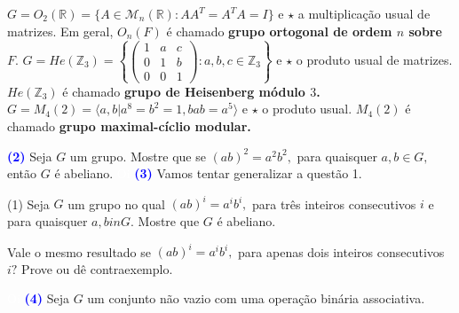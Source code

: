 \documentclass[12pt, a4paper]{article}
\newcommand{\negrito}[1]{\mbox{\boldmath{$#1$}}}
\begin{document}
\begin{tasks}[counter-format={(tsk[a])},label-width=3.6ex, label-format = {\bfseries}, column-sep = {0pt}]
\task[\textcolor{Floresta}{$\negrito{(i)} $}] $G = O_2(\mathbb{R}) = \{ A \in \mathcal{M}_n(\mathbb{R}) : AA^T = A^TA = I \}$ e $\star$ a multiplicação usual de matrizes. Em geral, $O_n(F)$ é chamado \textbf{grupo ortogonal de ordem $n$ sobre $F.$}
\task[\textcolor{Floresta}{$\negrito{(j)} $}] $G = He(\mathbb{Z}_3) = \left\{ \left( \begin{array}{ccc} 1 & a & c \\ 0 & 1 & b \\ 0 & 0 & 1 \end{array} \right) : a,b,c \in \mathbb{Z}_3 \right\}$ e $\star$ o produto usual de matrizes. $ He(\mathbb{Z}_3)$ é chamado \textbf{grupo de Heisenberg módulo $3$.}
\task[\textcolor{Floresta}{$\negrito{(k)} $}] $G = M_4(2) = \langle a,b | a^8 = b^2 = 1, bab = a^5 \rangle$ e $\star$ o produto usual. $ M_4(2)$ é chamado \textbf{grupo maximal-cíclio modular.}%

\end{tasks}
\textcolor{blue}{\bf(2)}\label{2} Seja $G$ um grupo. Mostre que se $(ab)^2 = a^2b^2,$ para quaisquer $a,b \in G,$ então $G$ é abeliano.
\textcolor{white}{Oi}\newline\newline
\textcolor{blue}{\bf(3)}\label{3} Vamos tentar generalizar a questão 1.
\begin{tasks}[counter-format={(tsk[a])},label-width=3.6ex, label-format = {\bfseries}, column-sep = {0pt}](1)
\task[\textcolor{Floresta}{$\negrito{(a)} $}] Seja $G$ um grupo no qual $(ab)^i = a^ib^i,$ para três inteiros consecutivos $i$ e para quaisquer $a,b in G.$ Mostre que $G$ é abeliano.

\task[\textcolor{Floresta}{$\negrito{(b)} $}] Vale o mesmo resultado se $(ab)^i = a^ib^i,$ para apenas dois inteiros consecutivos $i?$ Prove ou dê contraexemplo.
\end{tasks}
\textcolor{white}{Oi}\newline\newline
\textcolor{blue}{\bf(4)}\label{4} Seja $G$ um conjunto não vazio com uma operação binária associativa. 
\end{document}
